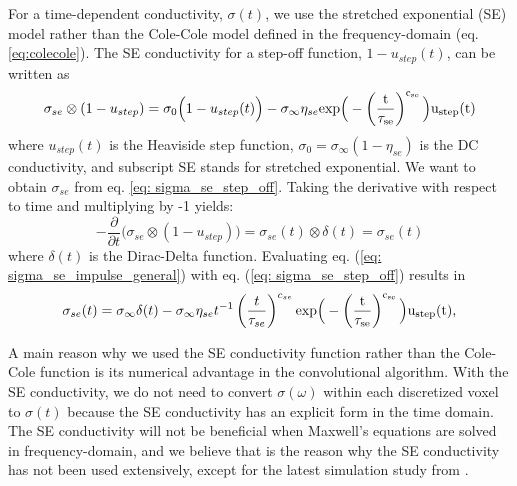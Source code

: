 \documentclass[manuscript]{geophysics}
\newcommand{\siginf}{\sigma_\infty}
\begin{document}
For a time-dependent conductivity, $\sigma(t)$, we use the stretched exponential (SE) model rather than the Cole-Cole model defined in the frequency-domain (eq. \ref{eq:colecole}). The SE conductivity for a step-off function, $1-u_{step}(t)$, can be written as
\begin{equation}
    \sigma_{se} \otimes (1-u_{step}) =
    \sigma_0 \Big(1-u_{step}(t)\Big)
    -\siginf \eta_{se}\rm{exp}\Big(-\left(\frac{t}{\tau_{se}}\right)^{c_{se}}\Big)u_{step}(t)
    \label{eq: sigma_se_step_off}
\end{equation}
where $u_{step}(t)$ is the Heaviside step function, $\sigma_0=\siginf(1-\eta_{se})$ is the DC conductivity, and subscript SE stands for stretched exponential. We want to obtain $\sigma_{se}$ from eq. \ref{eq: sigma_se_step_off}.
Taking the derivative with respect to time and multiplying by -1 yields:
\begin{equation}
    - \frac{\partial}{\partial t}\Big(\sigma_{se} \otimes (1-u_{step})\Big) = \sigma_{se}(t) \otimes \delta(t) = \sigma_{se}(t)
    \label{eq: sigma_se_impulse_general}
\end{equation}
where $\delta (t)$ is the Dirac-Delta function. Evaluating eq. (\ref{eq: sigma_se_impulse_general}) with eq. (\ref{eq: sigma_se_step_off}) results in
\begin{equation}
    \sigma_{se}(t)=\siginf \delta(t)-\siginf \eta_{se}t^{-1}\left(\frac{t}{\tau_{se}}\right)^{c_{se}}\rm{exp}\Big(-\left(\frac{t}{\tau_{se}}\right)^{c_{se}}\Big)u_{step}(t),
    \label{eq: sigma_se_impulse}
\end{equation}

A main reason why we used the SE conductivity function rather than the Cole-Cole function is its numerical advantage in the convolutional algorithm. With the SE conductivity, we do not need to convert  $\sigma(\omega)$ within each discretized voxel to $\sigma(t)$ because the SE conductivity has an explicit form in the time domain. The SE conductivity will not be beneficial when Maxwell's equations are solved in frequency-domain, and we believe that is the reason why the SE conductivity has not been used extensively, except for the latest simulation study from \cite{belliveau2018}.
\end{document}
